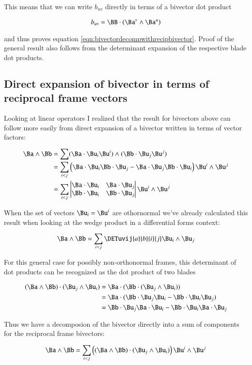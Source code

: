 \documentclass{article}      %
\begin{document}
This means that we can write $b_{uv}$ directly in terms of a bivector dot product

\begin{align*}
b_{uv} = \BB \cdot (\Ba^v \wedge \Ba^u)
\end{align*}

and thus proves equation \ref{eqn:bivectordecompwithrecipbivector}.  Proof of the general result
also follows from the determinant expansion of the respective blade dot products.

\subsection{ Direct expansion of bivector in terms of reciprocal frame vectors }

Looking at linear operators I realized that the result for bivectors above can follow more easily from direct expansion of a bivector written in terms of vector factors:

\begin{align*}
\Ba \wedge \Bb
&= \sum (\Ba \cdot \Bu_i \Bu^i) \wedge (\Bb \cdot \Bu_j \Bu^j) \\
&= \sum_{i<j} \left(\Ba \cdot \Bu_i \Bb \cdot \Bu_j - \Ba \cdot \Bu_j \Bb \cdot \Bu_i \right) \Bu^i \wedge \Bu^j \\
&= \sum_{i<j} 
\begin{vmatrix}
\Ba \cdot \Bu_i  & \Ba \cdot \Bu_j  \\
\Bb \cdot \Bu_i & \Bb \cdot \Bu_j  \\
\end{vmatrix}
\Bu^i \wedge \Bu^j \\
\end{align*}

When the set of vectors $\Bu_i = \Bu^i$ are othornormal we've already
calculated this result when looking at the wedge product in a differential
forms context:

\begin{equation}
\Ba \wedge \Bb = \sum_{i<j} \DETuvij{a}{b}{i}{j} \Bu_i \wedge \Bu_j
\end{equation}

For this general case for possibly non-orthonormal frames, this 
determinant of dot products can be recognized as the dot product of two blades

\begin{align*}
( \Ba \wedge \Bb ) \cdot (\Bu_j \wedge \Bu_i)
&= \Ba \cdot (\Bb \cdot (\Bu_j \wedge \Bu_i)) \\
&= \Ba \cdot (\Bb \cdot \Bu_j \Bu_i - \Bb \cdot \Bu_i \Bu_j) \\
&= \Bb \cdot \Bu_j \Ba \cdot \Bu_i - \Bb \cdot \Bu_i \Ba \cdot \Bu_j \\
\end{align*}

Thus we have a decomposion of the bivector directly into a sum of components
for the reciprocal frame bivectors:

\begin{equation}
\Ba \wedge \Bb
= \sum_{i<j} \left((\Ba \wedge \Bb) \cdot (\Bu_j \wedge \Bu_i) \right) \Bu^i \wedge \Bu^j
\end{equation}
\end{document}
